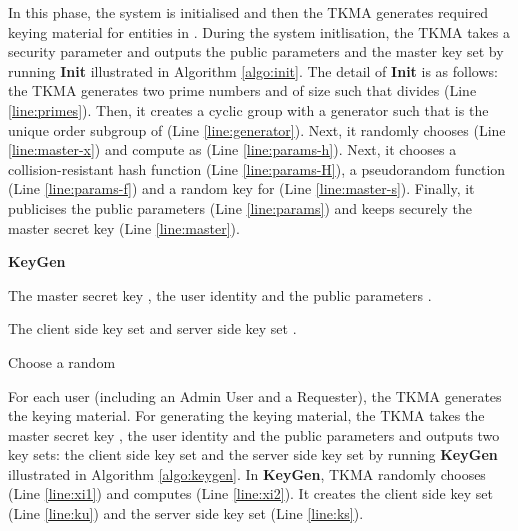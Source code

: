 \documentclass[final,5p,times,twocolumn]{elsarticle}
\newcommand{\algofontsize}{\fontsize{7}{8}\selectfont}
\begin{document}
In this phase, the system is initialised and then the TKMA generates required keying material for entities in . During the system initlisation, the TKMA takes a security parameter  and outputs the public parameters  and the master key set  by running \textbf{Init} illustrated in Algorithm \ref{algo:init}. The detail of \textbf{Init} is as follows: the TKMA generates two prime numbers  and  of size  such that  divides  (Line \ref{line:primes}). Then, it creates a cyclic group  with a generator  such that  is the unique order  subgroup of  (Line \ref{line:generator}). Next, it randomly chooses  (Line \ref{line:master-x}) and compute  as  (Line \ref{line:params-h}). Next, it chooses a collision-resistant hash function  (Line \ref{line:params-H}), a pseudorandom function  (Line \ref{line:params-f}) and a random key  for  (Line \ref{line:master-s}). Finally, it publicises the public parameters  (Line \ref{line:params}) and keeps securely the master secret key  (Line \ref{line:master}).




\begin{algorithm}[htp]
{\algofontsize
\caption{\textbf{KeyGen}}

\label{algo:keygen}

\begin{algorithmic}[1]

\REQUIRE The master secret key , the user identity  and the public parameters .

\ENSURE The client side key set  and server side key set .

\medskip

\STATE Choose a random  \label{line:xi1}
\STATE  \label{line:xi2}
\STATE  \label{line:ku}
\STATE  \label{line:ks}

\RETURN 

\end{algorithmic}
}
\end{algorithm}



For each user (including an Admin User and a Requester), the TKMA generates the keying material. For generating the keying material, the TKMA takes the master secret key , the user identity  and the public parameters  and outputs two key sets: the client side key set  and the server side key set  by running \textbf{KeyGen} illustrated in Algorithm \ref{algo:keygen}. In \textbf{KeyGen}, TKMA randomly chooses  (Line \ref{line:xi1}) and computes  (Line \ref{line:xi2}). It creates the client side key set  (Line \ref{line:ku}) and the server side key set  (Line \ref{line:ks}).
\end{document}
